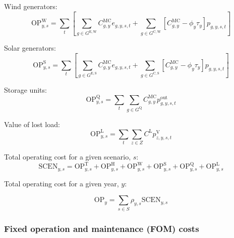 \documentclass{article}
\newcommand{\sGeneratorsExisting}{G^{\mathrm{E}}}
\newcommand{\sGeneratorsExistingWind}{G^{\mathrm{E,W}}}
\newcommand{\sGeneratorsExistingSolar}{G^{\mathrm{E,S}}}
\newcommand{\sGeneratorsCandidate}{G^{\mathrm{C}}}
\newcommand{\sGeneratorsCandidateWind}{G^{\mathrm{C,W}}}
\newcommand{\sGeneratorsCandidateSolar}{G^{\mathrm{C,S}}}
\newcommand{\sStorage}{G^{\mathrm{Q}}}
\newcommand{\sScenarios}{S}
\newcommand{\sZones}{Z}
\newcommand{\iGenerator}{g}
\newcommand{\iYear}{y}
\newcommand{\iScenario}{s}
\newcommand{\iInterval}{t}
\newcommand{\iZone}{z}
\newcommand{\cOperatingCost}[1][\iYear,\iScenario]{\mathrm{OP}_{#1}}
\newcommand{\cOperatingCostThermal}[1][\iYear,\iScenario]{\mathrm{OP}^{\mathrm{T}}_{#1}}
\newcommand{\cOperatingCostHydro}[1][\iYear,\iScenario]{\mathrm{OP}^{\mathrm{H}}_{#1}}
\newcommand{\cOperatingCostWind}[1][\iYear,\iScenario]{\mathrm{OP}^{\mathrm{W}}_{#1}}
\newcommand{\cOperatingCostSolar}[1][\iYear,\iScenario]{\mathrm{OP}^{\mathrm{S}}_{#1}}
\newcommand{\cOperatingCostStorage}[1][\iYear,\iScenario]{\mathrm{OP}^{\mathrm{Q}}_{#1}}
\newcommand{\cFixedOperationsMaintenanceCost}[1][\iYear]{\mathrm{FOM}_{#1}}
\newcommand{\cFixedOperationsMaintenanceCostGenerator}[1][\iGenerator]{C^{\mathrm{FOM}}_{#1}}
\newcommand{\cScenarioDuration}[1][\iYear,\iScenario]{\rho_{#1}}
\newcommand{\cMarginalCost}[1][\iGenerator,\iYear]{C^{\mathrm{MC}}_{#1}}
\newcommand{\cPowerOutputMax}[1][\iGenerator,\iYear]{\overline{P}_{#1}}
\newcommand{\cOperatingCostLostLoad}[1][\iYear,\iScenario]{\mathrm{OP}^{\mathrm{L}}_{#1}}
\newcommand{\cLostLoadCost}{C^{\mathrm{L}}}
\newcommand{\cOperatingCostScenario}[1][\iYear,\iScenario]{\mathrm{SCEN}_{#1}}
\newcommand{\cRetirementIndicator}[1][\iGenerator,\iYear]{F_{#1}}
\newcommand{\vBaseline}[1][\iYear]{\phi_{#1}}
\newcommand{\vPermitPrice}[1][\iYear]{\tau_{#1}}
\newcommand{\vEnergy}[1][\iGenerator,\iYear,\iScenario,\iInterval]{e_{#1}}
\newcommand{\vPower}[1][\iGenerator,\iYear,\iScenario,\iInterval]{p_{#1}}
\newcommand{\vPowerOut}[1][\iGenerator,\iYear,\iScenario,\iInterval]{p^{\mathrm{out}}_{#1}}
\newcommand{\vLostLoadPower}[1][\iZone,\iYear,\iScenario,\iInterval]{p^{\mathrm{V}}_{#1}}
\newcommand{\vInstalledCapacityTotal}[1][\iGenerator,\iYear]{a_{#1}}
\begin{document}
Wind generators:
\begin{equation}
	\cOperatingCostWind = \sum\limits_{\iInterval}\left[\sum\limits_{\iGenerator \in \sGeneratorsExistingWind} \cMarginalCost \vEnergy + \sum\limits_{\iGenerator \in \sGeneratorsCandidateWind} \left[\cMarginalCost - \vBaseline \vPermitPrice\right] \vPower\right]
\end{equation}

Solar generators:
\begin{equation}
	\cOperatingCostSolar = \sum\limits_{\iInterval}\left[\sum\limits_{\iGenerator \in \sGeneratorsExistingSolar} \cMarginalCost \vEnergy + \sum\limits_{\iGenerator \in \sGeneratorsCandidateSolar} \left[\cMarginalCost - \vBaseline\vPermitPrice\right] \vPower\right]
\end{equation}

Storage units:
\begin{equation}
	\cOperatingCostStorage = \sum\limits_{\iInterval}\sum\limits_{\iGenerator \in \sStorage} \cMarginalCost \vPowerOut
\end{equation}

Value of lost load:
\begin{equation}
	\cOperatingCostLostLoad = \sum\limits_{\iInterval}\sum\limits_{\iZone \in \sZones} \cLostLoadCost \vLostLoadPower
\end{equation}

Total operating cost for a given scenario, $\iScenario$:
\begin{equation}
	\cOperatingCostScenario = \cOperatingCostThermal + \cOperatingCostHydro + \cOperatingCostWind + \cOperatingCostSolar + \cOperatingCostStorage + \cOperatingCostLostLoad
\end{equation}

Total operating cost for a given year, $\iYear$:

\begin{equation}
	\cOperatingCost[\iYear] = \sum\limits_{\iScenario \in \sScenarios} \cScenarioDuration \cOperatingCostScenario
\end{equation}

\subsubsection{Fixed operation and maintenance (FOM) costs}

\end{document}
